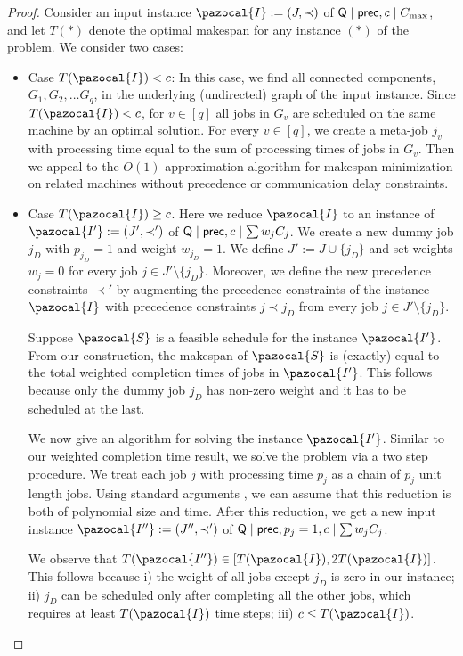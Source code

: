   
  \begin{proof}
  Consider an input instance $\pazocal{I} := (J, \prec)$ of $\mathsf{Q} \mid \mathsf{prec}, c \mid C_{\max}$, and let $T(*)$ denote the optimal makespan for any instance $(*)$ of the problem. We consider two cases:
  \begin{itemize}
  
  \item Case $T(\pazocal{I}) < c$: In this case, we find all connected components, $G_1, G_2, \ldots G_q$, in the underlying (undirected) graph of the input instance. Since $T(\pazocal{I}) < c$, for $v \in [q]$ all jobs in $G_v$ are scheduled on the same machine by an optimal solution. For every $v \in [q]$, we create a meta-job $j_v$ with processing time equal to the sum of processing times of jobs in $G_v$. Then we appeal to the $O(1)$-approximation algorithm for makespan minimization on related machines without precedence or communication delay constraints. 
  
  \item Case $T(\pazocal{I}) \geq c$.  Here we reduce $\pazocal{I}$ to an instance of $\pazocal{I'}:=  (J', \prec')$ of $\mathsf{Q} \mid \mathsf{prec}, c \mid \sum w_j C_j$.  We create a new dummy job $j_{D}$ with $p_{j_D} = 1$ and weight $w_{j_D} = 1$. 
  We define $J' := J \cup \{j_{D}\}$ and set weights $w_j = 0$ for every job $j \in J' \setminus \{j_D\}$. 
  Moreover, we define the new precedence constraints $\prec'$ by augmenting the precedence constraints of the instance $\pazocal{I}$ with precedence constraints $j \prec j_{D}$ from every job $j \in J' \setminus \{j_D\}$.
  
  Suppose $\pazocal{S}$ is a feasible schedule for the instance  $\pazocal{I'}$.
  From our construction, the makespan of $\pazocal{S}$ is (exactly) equal to the total weighted completion times of jobs in $\pazocal{I'}$.
  This follows because only the dummy job $j_D$ has non-zero weight and it has to be scheduled at the last.
  
  We now give an algorithm for solving the instance $\pazocal{I'}$.
  Similar to our weighted completion time result, we solve the problem via a two step procedure.
  We treat each job $j$ with processing time $p_j$ as a chain of $p_j$ unit length jobs. Using standard arguments \cite{DKRTZ20}, we can assume that this reduction is both of polynomial size and time. After this reduction, we get a new input instance $\pazocal{I''}:= (J'', \prec')$ of $\mathsf{Q} \mid \mathsf{prec}, p_j = 1, c \mid\sum w_j C_j$. 
  
  We observe that $T(\pazocal{I''})\in [T(\pazocal{I}), 2 T(\pazocal{I})]$.
  This follows because i) the weight of all jobs except $j_{D}$ is zero in our instance; ii) $j_{D}$ can be scheduled only after completing all the other jobs, which requires at least  $T(\pazocal{I})$ time steps; iii) $c \leq   T(\pazocal{I})$.
  

\end{itemize}
\end{proof}
